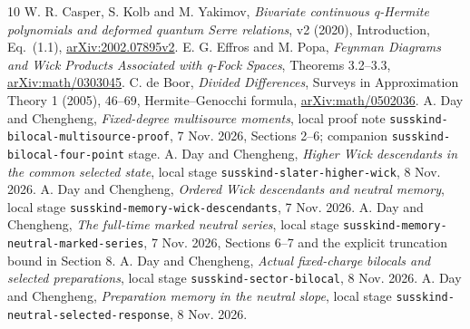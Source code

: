 \documentclass[11pt]{article}
\begin{document}
\begin{thebibliography}{10}\small
{} W. R. Casper, S. Kolb and M. Yakimov,
\emph{Bivariate continuous q-Hermite polynomials and deformed
quantum Serre relations}, v2 (2020), Introduction, Eq.~(1.1),
\href{https://arxiv.org/abs/2002.07895v2}{arXiv:2002.07895v2}.
 E. G. Effros and M. Popa,
\emph{Feynman Diagrams and Wick Products Associated with
q-Fock Spaces}, Theorems 3.2--3.3,
\href{https://arxiv.org/abs/math/0303045}{arXiv:math/0303045}.
 C. de Boor, \emph{Divided Differences},
Surveys in Approximation Theory 1 (2005), 46--69,
Hermite--Genocchi formula,
\href{https://arxiv.org/abs/math/0502036}{arXiv:math/0502036}.
 A. Day and Chengheng,
\emph{Fixed-degree multisource moments}, local proof note
\texttt{susskind-bilocal-multisource-proof}, 7 Nov. 2026,
Sections 2--6; companion \texttt{susskind-bilocal-four-point} stage.
 A. Day and Chengheng,
\emph{Higher Wick descendants in the common selected state},
local stage \texttt{susskind-slater-higher-wick}, 8 Nov. 2026.
 A. Day and Chengheng,
\emph{Ordered Wick descendants and neutral memory}, local stage
\texttt{susskind-memory-wick-descendants}, 7 Nov. 2026.
 A. Day and Chengheng,
\emph{The full-time marked neutral series}, local stage
\texttt{susskind-memory-neutral-marked-series}, 7 Nov. 2026,
Sections 6--7 and the explicit truncation bound in Section 8.
 A. Day and Chengheng,
\emph{Actual fixed-charge bilocals and selected preparations},
local stage \texttt{susskind-sector-bilocal}, 8 Nov. 2026.
 A. Day and Chengheng,
\emph{Preparation memory in the neutral slope}, local stage
\texttt{susskind-neutral-selected-response}, 8 Nov. 2026.
\end{thebibliography}
\end{document}
